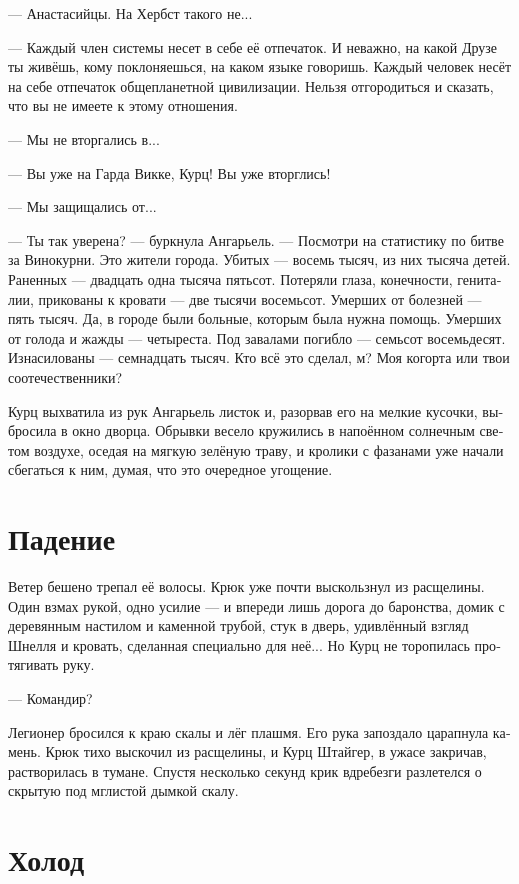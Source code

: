 \documentclass[a4paper,12pt,fleqn]{book}\usepackage{cooltooltips}\usepackage{polyglossia}\setdefaultlanguage[babelshorthands=true]{russian}\setotherlanguage{english}\defaultfontfeatures{Ligatures=TeX,Mapping=tex-text} \usepackage{xcolor}\definecolor{lightgray}{HTML}{bbbbbb}\color{lightgray}\newcommand{\ml}[3]{\textenglish{\textcolor{black}{#3}}}
\begin{document}
--- Анастасийцы.
На Хербст такого не...

--- Каждый член системы несет в себе её отпечаток.
И неважно, на какой Друзе ты живёшь, кому поклоняешься, на каком языке говоришь.
Каждый человек несёт на себе отпечаток общепланетной цивилизации.
Нельзя отгородиться и сказать, что вы не имеете к этому отношения.

--- Мы не вторгались в...

--- Вы уже на Гарда Викке, Курц!
Вы уже вторглись!

--- Мы защищались от...

--- Ты так уверена? --- буркнула Ангарьель.
--- Посмотри на статистику по битве за Винокурни.
Это жители города.
Убитых --- восемь тысяч, из них тысяча детей.
Раненных --- двадцать одна тысяча пятьсот.
Потеряли глаза, конечности, гениталии, прикованы к кровати --- две тысячи восемьсот.
Умерших от болезней --- пять тысяч.
Да, в городе были больные, которым была нужна помощь.
Умерших от голода и жажды --- четыреста.
Под завалами погибло --- семьсот восемьдесят.
Изнасилованы --- семнадцать тысяч.
Кто всё это сделал, м?
Моя когорта или твои соотечественники?

Курц выхватила из рук Ангарьель листок и, разорвав его на мелкие кусочки, выбросила в окно дворца.
Обрывки весело кружились в напоённом солнечным светом воздухе, оседая на мягкую зелёную траву, и кролики с фазанами уже начали сбегаться к ним, думая, что это очередное угощение.

\section{Падение}

Ветер бешено трепал её волосы.
Крюк уже почти выскользнул из расщелины.
Один взмах рукой, одно усилие --- и впереди лишь дорога до баронства, домик с деревянным настилом и каменной трубой, стук в дверь, удивлённый взгляд Шнелля и кровать, сделанная специально для неё...
Но Курц не торопилась протягивать руку.

--- Командир?

Легионер бросился к краю скалы и лёг плашмя.
Его рука запоздало царапнула камень.
Крюк тихо выскочил из расщелины, и Курц Штайгер, в ужасе закричав, растворилась в тумане.
Спустя несколько секунд крик вдребезги разлетелся о скрытую под мглистой дымкой скалу. 

\section{Холод}
\end{document}
